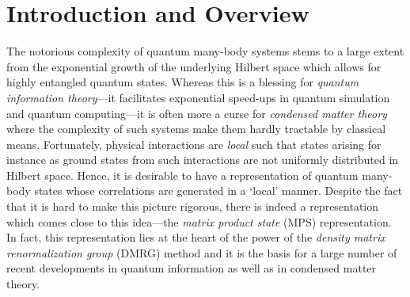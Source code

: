 \documentclass[aps,prl,epsfig,graphics,floatfix,mathbbm,a4paper]{article}
\newcommand{\1}{\mathbbm{1}}
\renewcommand{\>}{\rangle}
\newcommand{\<}{\langle}
\begin{document}
\vspace*{10pt}





\tableofcontents

\section{Introduction and Overview}

The notorious complexity of quantum many-body systems stems to a
large extent from the exponential growth of the underlying Hilbert
space which allows for highly entangled quantum states. Whereas
this
is a blessing for \emph{quantum information
    theory}---it facilitates exponential speed-ups in quantum
simulation and quantum computing---it is often more a curse for
\emph{condensed matter theory} where the complexity of such
systems make them hardly tractable by classical means.
Fortunately, physical interactions are \emph{local} such that
states arising for instance as ground states from such
interactions are not uniformly distributed in Hilbert space.
Hence, it is desirable to have a representation of quantum
many-body states whose correlations are generated in a `local'
manner. Despite the fact that it is hard to make this picture
rigorous, there is indeed a representation which comes close to
this idea---the \emph{matrix product state} (MPS) representation.
In fact, this representation lies at the heart of the power of the
\emph{density matrix renormalization group} (DMRG) method and it
is the basis for a large number of recent developments in quantum
information as well as in condensed matter theory.
\end{document}
